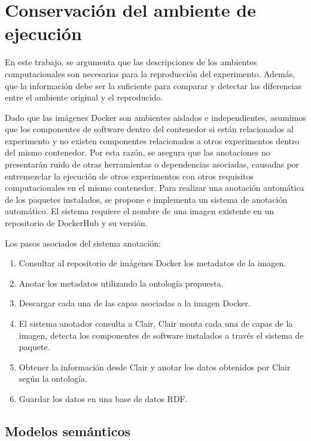 \chapter{Conservación del ambiente de ejecución}

En este trabajo, se argumenta que las descripciones de los ambientes computacionales son necesarias para la reproducción del experimento. Además, que la información debe ser la suficiente para comparar y detectar las diferencias entre el ambiente original y el reproducido.

Dado que las imágenes Docker son ambientes aislados e independientes, asumimos que los componentes de software dentro del contenedor si están relacionados al experimento y no existen componentes relacionados a otros experimentos dentro del mismo contenedor.
Por esta razón, se asegura que las anotaciones no presentarán ruido de otras herramientas o dependencias asociadas, causadas por entremezclar la ejecución de otros experimentos con otros requisitos computacionales en el mismo contenedor.
Para realizar una anotación automática de los paquetes instalados, se propone e implementa un sistema de anotación automático. El sistema requiere el nombre de una imagen existente en un repositorio de DockerHub y su versión. 

Los pasos asociados del sistema anotación:
\begin{enumerate}
	\item Consultar al repositorio de imágenes Docker los metadatos de la imagen. 
	\item Anotar los metadatos utilizando la ontología propuesta.
	\item Descargar cada una de las capas asociadas a la imagen Docker.
	\item El sistema anotador consulta a Clair, Clair monta cada una de capas de la imagen, detecta los componentes de software instalados a través el sistema de paquete.
	\item Obtener la información desde Clair y anotar los datos obtenidos por Clair según la ontología.
	\item Guardar los datos en una base de datos RDF.
\end{enumerate} 

\section{Modelos semánticos}\label{s4.1}
     
